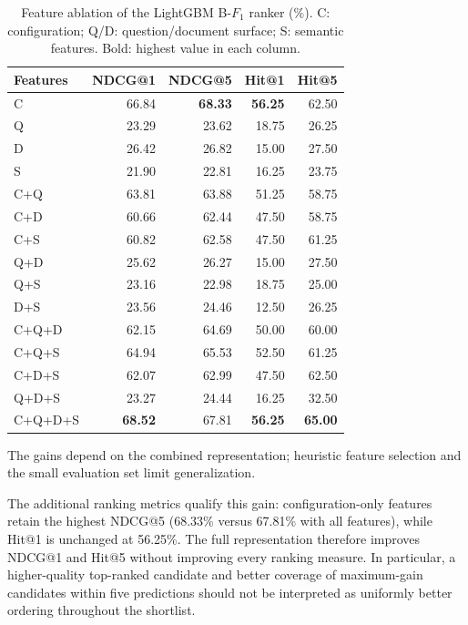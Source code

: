 \begin{table}[tb]
\centering\small
\caption{Feature ablation of the LightGBM B-$F_1$ ranker (\%). C: configuration; Q/D: question/document surface; S: semantic features. Bold: highest value in each column.}
\label{tab:feature_ablation_ndcg_hit}
\setlength{\tabcolsep}{3pt}
\begin{tabular}{lrrrr}
\toprule
Features & NDCG@1 & NDCG@5 & Hit@1 & Hit@5 \\
\midrule
C & 66.84 & \textbf{68.33} & \textbf{56.25} & 62.50 \\
Q & 23.29 & 23.62 & 18.75 & 26.25 \\
D & 26.42 & 26.82 & 15.00 & 27.50 \\
S & 21.90 & 22.81 & 16.25 & 23.75 \\
\midrule
C+Q & 63.81 & 63.88 & 51.25 & 58.75 \\
C+D & 60.66 & 62.44 & 47.50 & 58.75 \\
C+S & 60.82 & 62.58 & 47.50 & 61.25 \\
Q+D & 25.62 & 26.27 & 15.00 & 27.50 \\
Q+S & 23.16 & 22.98 & 18.75 & 25.00 \\
D+S & 23.56 & 24.46 & 12.50 & 26.25 \\
\midrule
C+Q+D & 62.15 & 64.69 & 50.00 & 60.00 \\
C+Q+S & 64.94 & 65.53 & 52.50 & 61.25 \\
C+D+S & 62.07 & 62.99 & 47.50 & 62.50 \\
Q+D+S & 23.27 & 24.44 & 16.25 & 32.50 \\
\midrule
C+Q+D+S & \textbf{68.52} & 67.81 & \textbf{56.25} & \textbf{65.00} \\
\bottomrule
\end{tabular}
\end{table}

The gains depend on the combined representation; heuristic feature selection and the small evaluation set limit generalization.

The additional ranking metrics qualify this gain: configuration-only features retain the highest NDCG@5 (68.33\% versus 67.81\% with all features), while Hit@1 is unchanged at 56.25\%. The full representation therefore improves NDCG@1 and Hit@5 without improving every ranking measure. In particular, a higher-quality top-ranked candidate and better coverage of maximum-gain candidates within five predictions should not be interpreted as uniformly better ordering throughout the shortlist.

